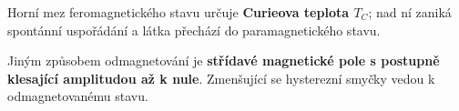 Horní mez feromagnetického stavu určuje \textbf{Curieova teplota $T_C$}; nad ní zaniká spontánní uspořádání a látka přechází do paramagnetického stavu.

Jiným způsobem odmagnetování je \textbf{střídavé magnetické pole s postupně klesající amplitudou až k nule}. Zmenšující se hysterezní smyčky vedou k odmagnetovanému stavu.
